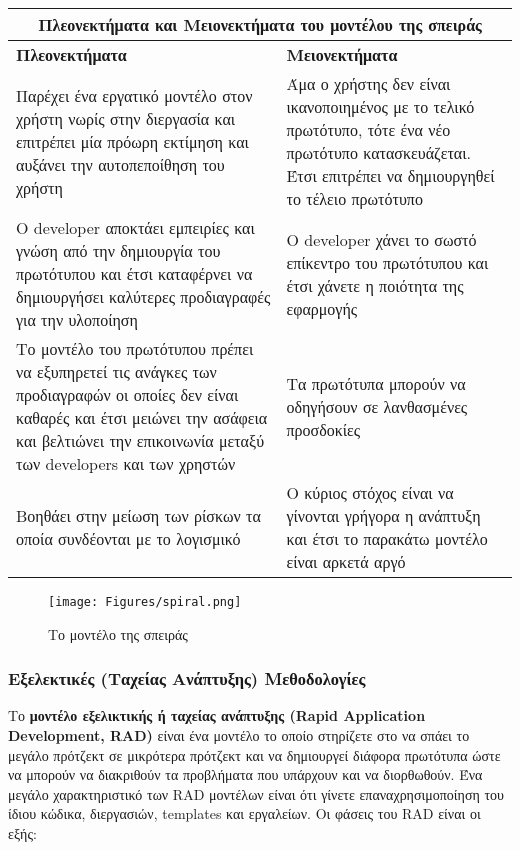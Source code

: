 \begin{center}
    \begin{tabular}{| p{8cm} | p{8cm} |}
        \hline
        \multicolumn{2}{|c|}{\textbf{Πλεονεκτήματα και Μειονεκτήματα του μοντέλου της σπειράς}} \\
        \hline
        \textbf{Πλεονεκτήματα} & \textbf{Μειονεκτήματα} \\
        \hline
        Παρέχει ένα εργατικό μοντέλο στον χρήστη νωρίς στην διεργασία και επιτρέπει μία πρόωρη εκτίμηση και αυξάνει την αυτοπεποίθηση του χρήστη & Άμα ο χρήστης δεν είναι ικανοποιημένος με το τελικό πρωτότυπο, τότε ένα νέο πρωτότυπο κατασκευάζεται. Έτσι επιτρέπει να δημιουργηθεί το τέλειο πρωτότυπο \\
        \hline
        Ο developer αποκτάει εμπειρίες και γνώση από την δημιουργία του πρωτότυπου και έτσι καταφέρνει να δημιουργήσει καλύτερες προδιαγραφές για την υλοποίηση & Ο developer χάνει το σωστό επίκεντρο του πρωτότυπου και έτσι χάνετε η ποιότητα της εφαρμογής \\
        \hline
        Το μοντέλο του πρωτότυπου πρέπει να εξυπηρετεί τις ανάγκες των προδιαγραφών οι οποίες δεν είναι καθαρές και έτσι μειώνει την ασάφεια και βελτιώνει την επικοινωνία μεταξύ των developers και των χρηστών & Τα πρωτότυπα μπορούν να οδηγήσουν σε λανθασμένες προσδοκίες \\
        \hline
        Βοηθάει στην μείωση των ρίσκων τα οποία συνδέονται με το λογισμικό & Ο κύριος στόχος είναι να γίνονται γρήγορα η ανάπτυξη και έτσι το παρακάτω μοντέλο είναι αρκετά αργό \\
        \hline
    \end{tabular}
\end{center}

\begin{figure}[th]
    \centering
    \texttt{[image: Figures/spiral.png]}
    \caption[Το μοντέλο της σπειράς]{Το μοντέλο της σπειράς}
    \label{fig:spiral}
\end{figure}

\newpage
\subsubsection{Εξελεκτικές (Ταχείας Ανάπτυξης) Μεθοδολογίες}

Το \textbf{μοντέλο εξελικτικής ή ταχείας ανάπτυξης (Rapid Application Development, RAD)} είναι ένα μοντέλο το οποίο στηρίζετε στο να σπάει το μεγάλο πρότζεκτ σε μικρότερα πρότζεκτ και να δημιουργεί διάφορα πρωτότυπα ώστε να μπορούν να διακριθούν τα προβλήματα που υπάρχουν και να διορθωθούν. Ένα μεγάλο χαρακτηριστικό των RAD μοντέλων είναι ότι γίνετε επαναχρησιμοποίηση του ίδιου κώδικα, διεργασιών, templates και εργαλείων.
Οι φάσεις του RAD είναι οι εξής:

